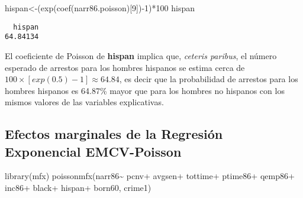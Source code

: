 \documentclass[
  letterpaper,
  DIV=11,
  numbers=noendperiod]{scrreprt}
\newenvironment{Shaded}{\begin{snugshade}}{\end{snugshade}}
\newcommand{\DecValTok}[1]{\textcolor[rgb]{0.68,0.00,0.00}{#1}}
\newcommand{\FunctionTok}[1]{\textcolor[rgb]{0.28,0.35,0.67}{#1}}
\newcommand{\NormalTok}[1]{\textcolor[rgb]{0.00,0.23,0.31}{#1}}
\newcommand{\OtherTok}[1]{\textcolor[rgb]{0.00,0.23,0.31}{#1}}
\newcommand{\SpecialCharTok}[1]{\textcolor[rgb]{0.37,0.37,0.37}{#1}}
\begin{document}
\begin{Shaded}
\begin{Highlighting}[]
\NormalTok{hispan}\OtherTok{\textless{}{-}}\NormalTok{(}\FunctionTok{exp}\NormalTok{(}\FunctionTok{coef}\NormalTok{(narr86.poisson)[}\DecValTok{9}\NormalTok{])}\SpecialCharTok{{-}}\DecValTok{1}\NormalTok{)}\SpecialCharTok{*}\DecValTok{100}
\NormalTok{hispan}
\end{Highlighting}
\end{Shaded}

\begin{verbatim}
  hispan 
64.84134 
\end{verbatim}

El coeficiente de Poisson de \textbf{hispan} implica que, \emph{ceteris
paribus}, el número esperado de arrestos para los hombres hispanos se
estima cerca de \(100\times[exp(0.5)-1]\approx 64.84\), es decir que la
probabilidad de arrestos para los hombres hispanos es 64.87\% mayor que
para los hombres no hispanos con los mismos valores de las variables
explicativas.

\subsection{Efectos marginales de la Regresión Exponencial
EMCV-Poisson}\label{efectos-marginales-de-la-regresiuxf3n-exponencial-emcv-poisson}

\begin{Shaded}
\begin{Highlighting}[]
\FunctionTok{library}\NormalTok{(mfx)}
\FunctionTok{poissonmfx}\NormalTok{(narr86}\SpecialCharTok{\textasciitilde{}}
\NormalTok{                  pcnv}\SpecialCharTok{+}
\NormalTok{                  avgsen}\SpecialCharTok{+}
\NormalTok{                  tottime}\SpecialCharTok{+}
\NormalTok{                  ptime86}\SpecialCharTok{+}
\NormalTok{                  qemp86}\SpecialCharTok{+}
\NormalTok{                  inc86}\SpecialCharTok{+}
\NormalTok{                  black}\SpecialCharTok{+}
\NormalTok{                  hispan}\SpecialCharTok{+}
\NormalTok{                  born60,}
\NormalTok{               crime1)}
\end{Highlighting}
\end{Shaded}
\end{document}
